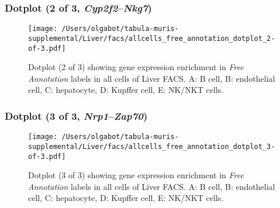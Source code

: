 \clearpage

\subsubsection{Dotplot (2 of 3, \emph{Cyp2f2}--\emph{Nkg7})}
\begin{figure}[h]
\centering
\texttt{[image: /Users/olgabot/tabula-muris-supplemental/Liver/facs/allcells\_free\_annotation\_dotplot\_2-of-3.pdf]}

\caption{ Dotplot (2 of 3)  showing gene expression enrichment in \emph{Free Annotation} labels in all cells of Liver FACS. A: B cell, B: endothelial cell, C: hepatocyte, D: Kupffer cell, E: NK/NKT cells.}
\end{figure}


\clearpage

\subsubsection{Dotplot (3 of 3, \emph{Nrp1}--\emph{Zap70})}
\begin{figure}[h]
\centering
\texttt{[image: /Users/olgabot/tabula-muris-supplemental/Liver/facs/allcells\_free\_annotation\_dotplot\_3-of-3.pdf]}

\caption{ Dotplot (3 of 3)  showing gene expression enrichment in \emph{Free Annotation} labels in all cells of Liver FACS. A: B cell, B: endothelial cell, C: hepatocyte, D: Kupffer cell, E: NK/NKT cells.}
\end{figure}

